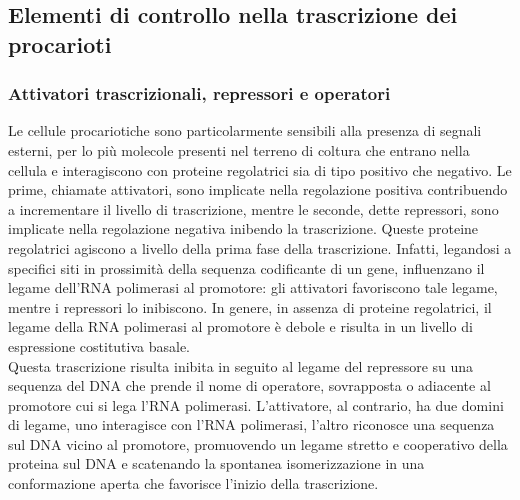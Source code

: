 \documentclass{article}
\begin{document}
\subsection{Elementi di controllo nella trascrizione dei procarioti}
\subsubsection{Attivatori trascrizionali, repressori e operatori}
Le cellule procariotiche sono particolarmente sensibili alla presenza di segnali
esterni, per lo più molecole presenti nel terreno di coltura che entrano nella
cellula e interagiscono con proteine regolatrici sia di tipo positivo che negativo.
Le prime, chiamate attivatori, sono implicate nella regolazione positiva contribuendo a incrementare il livello di trascrizione, mentre le seconde, 
dette repressori, sono implicate nella regolazione negativa inibendo la trascrizione. Queste
proteine regolatrici agiscono a livello della prima fase della trascrizione. Infatti,
legandosi a specifici siti in prossimità della sequenza codificante di un gene, influenzano il legame dell'RNA polimerasi al promotore: gli attivatori favoriscono
tale legame, mentre i repressori lo inibiscono. In genere, in assenza di proteine
regolatrici, il legame della RNA polimerasi al promotore è debole e risulta in
un livello di espressione costitutiva basale.\\
Questa trascrizione risulta inibita in seguito al legame del repressore su una sequenza del DNA che prende il nome di
operatore, sovrapposta o adiacente al promotore cui si lega l'RNA polimerasi.
L'attivatore, al contrario, ha due domini di legame, uno interagisce con l'RNA
polimerasi, l'altro riconosce una sequenza sul DNA vicino al promotore, promuovendo un legame stretto e cooperativo della proteina sul DNA e scatenando
la spontanea isomerizzazione in una conformazione aperta che favorisce l'inizio
della trascrizione.\\
\end{document}

